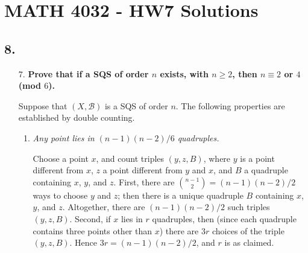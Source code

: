 \documentclass[a4paper,12pt]{article}
\begin{document}
\section*{MATH 4032 - HW7 Solutions}
\subsection*{8.}
\begin{enumerate}
    \item[7.]
        \boldmath
        \textbf{Prove that if a SQS of order $n$ exists, with $n \geq 2$, then $n \equiv 2$ or $4$ (mod $6$).} \par
        \unboldmath
        Suppose that $(X, \mathcal{B})$ is a SQS of order $n$. The following properties are established by double counting.
        \begin{enumerate}
            \item
                \textit{Any point lies in $(n - 1)(n - 2)/6$ quadruples.} \par
                Choose a point $x$, and count triples $(y, z, B)$, where $y$ is a point different from $x$, $z$ a point different from $y$ and $x$, and $B$ a quadruple containing $x$, $y$, and $z$. First, there are $\binom{n - 1}{2} = (n - 1)(n - 2)/2$ ways to choose $y$ and $z$; then there is a unique quadruple $B$ containing $x$, $y$, and $z$. Altogether, there are $(n - 1)(n - 2)/2$ such triples $(y, z, B)$. Second, if $x$ lies in $r$ quadruples, then (since each quadruple contains three points other than $x$) there are $3r$ choices of the triple $(y, z, B)$. Hence $3r = (n - 1)(n - 2)/2$, and $r$ is as claimed.


\end{enumerate}
\end{enumerate}
\end{document}
